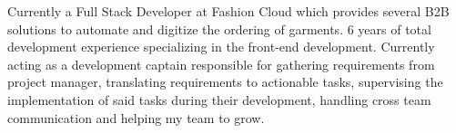 

\begin{cvparagraph}

Currently a Full Stack Developer at Fashion Cloud which provides several B2B solutions to automate and digitize the ordering of garments. 6 years of total development experience specializing in the front-end development. Currently acting as a development captain responsible for gathering requirements from project manager, translating requirements to actionable tasks, supervising the implementation of said tasks during their development, handling cross team communication and helping my team to grow.
\end{cvparagraph}
